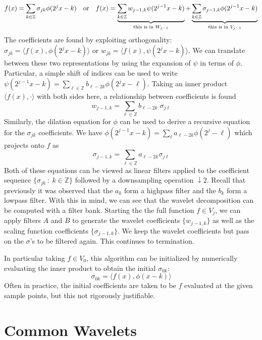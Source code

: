 \documentclass[onecolumn]{gwclass}
\newcommand{\Z}{\mathbb{Z}}
\begin{document}
\begin{align*}
	f(x) = \sum_{k\in\mathbb{Z}} \sigma_{jk} \phi(2^jx - k) && \text{\normalfont{or}} &&
	f(x) = \underbrace{\sum_{k\in\mathbb{Z}} w_{j-1,k} \psi(2^{j-1}x - k)}_{\text{\normalfont{this is in }} W_{j-1}} + \underbrace{\sum_{k\in\mathbb{Z}} \sigma_{j-1,k} \phi(2^{j-1}x - k)}_{\text{\normalfont{this is in }} V_{j-1}}
\end{align*}
The coefficients are found by exploiting orthogonality: $\sigma_{jk} = \langle f(x), \phi(2^jx - k)\rangle$ or $w_{jk} = \langle f(x), \psi(2^jx - k)\rangle$. We can translate between these two representations by using the expansion of $\psi$ in terms of $\phi$. Particular, a simple shift of indices can be used to write $ \psi(2^{j-1}x-k) = \sum_{\ell\in\Z} b_{\ell-2k}\phi(2^jx - \ell) $. Taking an inner product $\langle f(x), \cdot \rangle$ with both sides here, a relationship between coefficients is found
$$ w_{j-1,k}  = \sum_{\ell\in\mathbb{Z}} b_{\ell-2k}\;\sigma_{j\ell} $$
Similarly, the dilation equation for $\phi$ can be used to derive a recursive equation for the $\sigma_{jk}$ coefficients. We have $\phi(2^{j-1}x - k)=\sum_\ell a_{\ell-2k} \phi(2^j - \ell)$ which projects onto $f$ as
$$ \sigma_{j-1,k} = \sum_{\ell\in\Z} a_{\ell-2k}\sigma_{j\ell} $$ 
Both of these equations can be viewed as linear filters applied to the coefficient sequence $\{\sigma_{jk} \::\: k\in\Z\}$ followed by a downsampling operation $\downarrow 2$. Recall that previously it was observed that the $a_k$ form a highpass filter and the $b_k$ form a lowpass filter. With this in mind, we can see that the wavelet decomposition can be computed with a filter bank. Starting the the full function $f\in V_j$, we can apply filters $A$ and $B$ to generate the wavelet coefficients $\{w_{j-1,k}\}$ as well as the scaling function coefficients $\{\sigma_{j-1,k}\}$. We keep the wavelet coefficients but pass on the $\sigma$'s to be filtered again. This continues to termination.

In particular taking $f\in V_0$, this algorithm can be initialized by numerically evaluating the inner product to obtain the initial $\sigma_{0k}$:
$$ \sigma_{0k}=\langle f(x), \phi(x-k)\rangle $$
Often in practice, the initial coefficients are taken to be $f$ evaluated at the given sample points, but this not rigorously justifiable.




\section{Common Wavelets}
\end{document}

